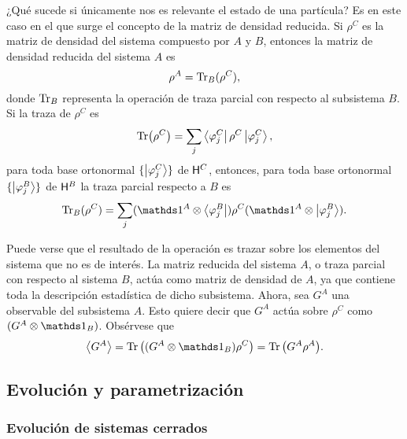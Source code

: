 
¿Qué sucede si únicamente nos es relevante el estado de una partícula? Es en este caso en el que surge el concepto de la matriz de densidad reducida. Si $\rho^{C}$ es la matriz de densidad del sistema compuesto por $A$ y $B$, entonces la matriz de densidad reducida del sistema $A$ es
\begin{equation}
    \rho^{A}=\Tr_{B}(\rho^{C}),\nonumber
\end{equation}
donde $\Tr_{B}$ representa la operación de traza parcial con respecto al subsistema $B$. Si la traza de $\rho^{C}$ es 
\begin{equation}
    \Tr(\rho^{C})=\sum_{j}\bra{\varphi^{C}_{j}}\rho^{C}\ket{\varphi^{C}_{j}},\nonumber
\end{equation}
para toda base ortonormal $\{\ket{\varphi^{C}_{j}}\}$ de ${\sf H}^{C}$, entonces, para toda base ortonormal $\{\ket{\varphi^{B}_{j}}\}$ de ${\sf H}^{B}$  la traza parcial respecto a $B$ es \cite{Hardy}
\begin{equation}\label{eq:Ch1PartialTrace}
    \Tr_{B}(\rho^{C})=\sum_{j}(\Id^{A}\otimes \bra{\varphi^{B}_{j}})\rho^{C}(\Id^{A}\otimes \ket{\varphi^{B}_{j}}).
\end{equation}


Puede verse que el resultado de la operación es trazar sobre los elementos del sistema que no es de interés. La matriz reducida del sistema $A$, o traza parcial con respecto al sistema $B$, actúa como matriz de densidad de $A$, ya que contiene toda la descripción estadística de dicho subsistema. Ahora, sea $G^{A}$ una observable del subsistema $A$. Esto quiere decir que $G^{A}$ actúa sobre $\rho^{C}$ como $(G^{A}\otimes \Id_{B})$. Obsérvese que
\begin{equation}
    \expval{G^{A}}=\Tr\qty((G^A\otimes \Id_B)\rho^C)=\Tr \qty( G^A \rho^A ).\nonumber
\end{equation}

\subsection{Evolución y parametrización}
\label{subsec:ch2_evol_param}


\subsubsection{Evolución de sistemas cerrados}

